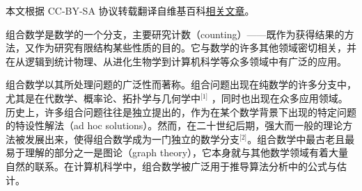 
本文根据 CC-BY-SA 协议转载翻译自维基百科\href{https://en.wikipedia.org/wiki/Combinatorics}{相关文章}。

组合数学是数学的一个分支，主要研究计数（counting）——既作为获得结果的方法，又作为研究有限结构某些性质的目的。它与数学的许多其他领域密切相关，并在从逻辑到统计物理、从进化生物学到计算机科学等众多领域中有广泛的应用。

组合数学以其所处理问题的广泛性而著称。组合问题出现在纯数学的许多分支中，尤其是在代数学、概率论、拓扑学与几何学中\(^\text{[1]}\) ，同时也出现在众多应用领域。  
历史上，许多组合问题往往是独立提出的，作为在某个数学背景下出现的特定问题的特设性解法（ad hoc solutions）。然而，在二十世纪后期，强大而一般的理论方法被发展出来，使得组合数学成为一门独立的数学分支\(^\text{[2]}\)。组合数学中最古老且最易于理解的部分之一是图论（graph theory），它本身就与其他数学领域有着大量自然的联系。在计算机科学中，组合数学被广泛用于推导算法分析中的公式与估计。


